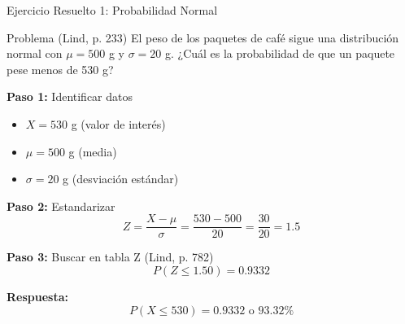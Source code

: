 \documentclass[10pt]{beamer}
\begin{document}
\begin{frame}{Ejercicio Resuelto 1: Probabilidad Normal}
\begin{exampleblock}{Problema (Lind, p. 233)}
El peso de los paquetes de café sigue una distribución normal con $\mu = 500$ g y $\sigma = 20$ g. ¿Cuál es la probabilidad de que un paquete pese menos de 530 g?
\end{exampleblock}

\vspace{0.2cm}
\begin{block}{\textbf{Paso 1:} Identificar datos}
\begin{itemize}
  \item $X = 530$ g (valor de interés)
  \item $\mu = 500$ g (media)
  \item $\sigma = 20$ g (desviación estándar)
\end{itemize}
\end{block}

\begin{block}{\textbf{Paso 2:} Estandarizar}
$$Z = \frac{X - \mu}{\sigma} = \frac{530 - 500}{20} = \frac{30}{20} = 1.5$$
\end{block}

\begin{block}{\textbf{Paso 3:} Buscar en tabla Z (Lind, p. 782)}
$$P(Z \leq 1.50) = 0.9332$$
\end{block}

\begin{exampleblock}{\textbf{Respuesta:}}
$$\boxed{P(X \leq 530) = 0.9332 \text{ o } 93.32\%}$$
\end{exampleblock}
\end{frame}
\end{document}
